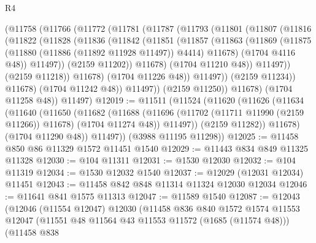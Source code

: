 \begin{lexlean}{R4}
\begin{coremodule}
              (@11758
                (@11766
                  (@11772
                    (@11781
                      (@11787
                        (@11793
                          (@11801
                            (@11807
                              (@11816
                                (@11822
                                  (@11828
                                    (@11836
                                      (@11842
                                        (@11851
                                          (@11857
                                            (@11863
                                              (@11869
                                                (@11875
                                                  (@11880 (@11886 (@11892 @11928 @11497)) @4414)
                                                  @11678)
                                                (@1704 @4116 @48))
                                              @11497))
                                          (@2159 @11202))
                                        @11678)
                                      (@1704 @11210 @48))
                                    @11497))
                                (@2159 @11218))
                              @11678)
                            (@1704 @11226 @48))
                          @11497))
                      (@2159 @11234))
                    @11678)
                  (@1704 @11242 @48))
                @11497))
            (@2159 @11250))
          @11678)
        (@1704 @11258 @48))
      @11497)
@12019 := @11511
    (@11524
      (@11620
        (@11626
          (@11634
            (@11640
              (@11650
                (@11682
                  (@11688
                    (@11696 (@11702 (@11711 @11990 (@2159 @11266)) @11678) (@1704 @11274 @48))
                    @11497))
                (@2159 @11282))
              @11678)
            (@1704 @11290 @48))
          @11497))
      (@3988 @11195 @11298))
@12025 := @11458 @850 @86 @11329 @1572 @11451 @1540
@12029 := @11443 @834 @849 @11325 @11328
@12030 := @104 @11311
@12031 := @1530 @12030
@12032 := @104 @11319
@12034 := @1530 @12032 @1540
@12037 := @12029 (@12031 @12034) @11451
@12043 := @11458 @842 @848 @11314 @11324 @12030 @12034
@12046 := @11641 @841 @1575 @11313
@12047 := @11589 @1540
@12087 := @12043
    (@12046
      (@11554 @12047)
      @12030
      (@11458
        @836
        @840
        @1572
        @1574
        @11553
        @12047
        (@11551 @48 @11564 @43 @11553 @11572 (@1685 (@11574 @48)))
        (@11458
          @838

\end{coremodule}
\end{lexlean}
